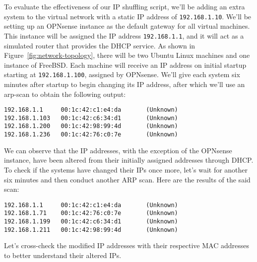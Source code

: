 To evaluate the effectiveness of our IP shuffling script, we'll be adding an extra system to the virtual network with a static IP address of \texttt{192.168.1.10}. We'll be setting up an OPNsense instance as the default gateway for all virtual machines. This instance will be assigned the IP address \texttt{192.168.1.1}, and it will act as a simulated router that provides the DHCP service. As shown in Figure~\ref{fig:network-topology}, there will be two Ubuntu Linux machines and one instance of FreeBSD. Each machine will receive an IP address on initial startup starting at \texttt{192.168.1.100}, assigned by OPNsense. We'll give each system six minutes after startup to begin changing its IP address, after which we'll use an arp-scan to obtain the following output:
\begin{verbatim}
192.168.1.1     00:1c:42:c1:e4:da       (Unknown)
192.168.1.103   00:1c:42:c6:34:d1       (Unknown)
192.168.1.200   00:1c:42:98:99:4d       (Unknown)
192.168.1.236   00:1c:42:76:c0:7e       (Unknown)
\end{verbatim}
We can observe that the IP addresses, with the exception of the OPNsense instance, have been altered from their initially assigned addresses through DHCP. To check if the systems have changed their IPs once more, let's wait for another six minutes and then conduct another ARP scan. Here are the results of the said scan:
\begin{verbatim}
192.168.1.1     00:1c:42:c1:e4:da       (Unknown)
192.168.1.71    00:1c:42:76:c0:7e       (Unknown)
192.168.1.199   00:1c:42:c6:34:d1       (Unknown)
192.168.1.211   00:1c:42:98:99:4d       (Unknown)
\end{verbatim}
Let's cross-check the modified IP addresses with their respective MAC addresses to better understand their altered IPs.

